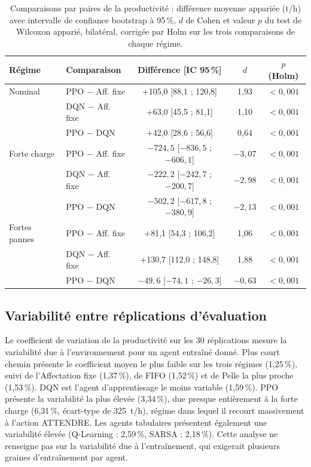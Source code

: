 \documentclass[11pt,a4paper]{article}
\newif\ifrevmarks
\newcommand{\revtag}[1]{\ifrevmarks\textsuperscript{\textcolor{red!70!black}{\scriptsize[#1]}}\fi}
\newcommand{\rev}[2]{\ifrevmarks{\color{revcolor}#2}\revtag{#1}\else#2\fi}
\newenvironment{revbloc}[1]{\par\ifrevmarks\color{revcolor}\noindent\revtag{#1}\ \fi}{\par}
\begin{document}
\begin{table}[H]
\centering
\caption{\rev{M3, M4, M6}{Comparaisons par paires de la productivité : différence moyenne appariée (t/h) avec intervalle de confiance bootstrap à 95\,\%, $d$ de Cohen et valeur $p$ du test de Wilcoxon apparié, bilatéral, corrigée par Holm sur les trois comparaisons de chaque régime.}}
\label{tab:stats}
\footnotesize
\setlength{\tabcolsep}{4pt}
\begin{tabular}{llccc}
\toprule
\textbf{Régime} & \textbf{Comparaison} & \textbf{Différence [IC 95\,\%]} & \textbf{$d$} & \textbf{$p$ (Holm)} \\
\midrule
Nominal       & PPO $-$ Aff. fixe & +105,0 [88,1 ; 120,8]   & 1,93 & $<0{,}001$ \\
              & DQN $-$ Aff. fixe & +63,0 [45,5 ; 81,1]     & 1,10 & $<0{,}001$ \\
              & PPO $-$ DQN       & +42,0 [28,6 ; 56,6]     & 0,64 & $<0{,}001$ \\
Forte charge  & PPO $-$ Aff. fixe & $-724{,}5$ [$-836{,}5$ ; $-606{,}1$] & $-3{,}07$ & $<0{,}001$ \\
              & DQN $-$ Aff. fixe & $-222{,}2$ [$-242{,}7$ ; $-200{,}7$] & $-2{,}98$ & $<0{,}001$ \\
              & PPO $-$ DQN       & $-502{,}2$ [$-617{,}8$ ; $-380{,}9$] & $-2{,}13$ & $<0{,}001$ \\
Fortes pannes & PPO $-$ Aff. fixe & +81,1 [54,3 ; 106,2]    & 1,06 & $<0{,}001$ \\
              & DQN $-$ Aff. fixe & +130,7 [112,0 ; 148,8]  & 1,88 & $<0{,}001$ \\
              & PPO $-$ DQN       & $-49{,}6$ [$-74{,}1$ ; $-26{,}3$] & $-0{,}63$ & $<0{,}001$ \\
\bottomrule
\end{tabular}
\end{table}

\subsection{Variabilité entre réplications d'évaluation}
\label{sec:stability}

\begin{revbloc}{M7}
Le coefficient de variation de la productivité sur les 30 réplications mesure la variabilité due à l'environnement pour un agent entraîné donné. Plus court chemin présente le coefficient moyen le plus faible sur les trois régimes (1,25\,\%), suivi de l'Affectation fixe (1,37\,\%), de FIFO (1,52\,\%) et de Pelle la plus proche (1,53\,\%). DQN est l'agent d'apprentissage le moins variable (1,59\,\%). PPO présente la variabilité la plus élevée (3,34\,\%), due presque entièrement à la forte charge (6,31\,\%, écart-type de 325~t/h), régime dans lequel il recourt massivement à l'action ATTENDRE. Les agents tabulaires présentent également une variabilité élevée (Q-Learning : 2,59\,\%, SARSA : 2,18\,\%). Cette analyse ne renseigne pas sur la variabilité due à l'entraînement, qui exigerait plusieurs graines d'entraînement par agent.
\end{revbloc}
\end{document}
